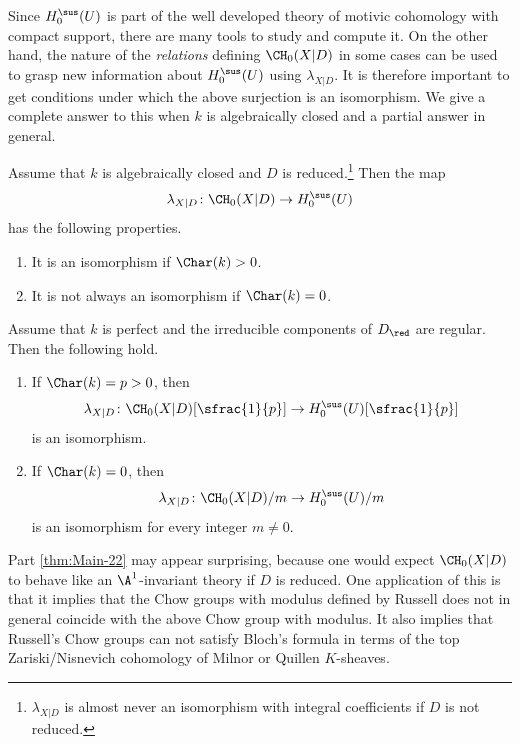 Since $H^{\sus}_0(U)$ is part of the well developed theory of
motivic cohomology with compact support, there are many tools
to study and compute it. On the other hand, the nature of the \emph{relations}
defining $\CH_0(X|D)$ in some cases
can be used to grasp new information about $H^{\sus}_0(U)$ using $\lambda_{X|D}$.
It is therefore important to get conditions under which the above surjection is an
isomorphism.
We give a complete answer to this when $k$ is algebraically closed and
a partial answer in general.

\begin{thm}\label{thm:Main-2}
Assume that $k$ is algebraically closed and $D$ is
reduced.\footnote{$\lambda_{X|D}$ is almost never an
isomorphism with integral coefficients if $D$ is not reduced.} Then the map
\[
\lambda_{X|D} \colon \CH_0(X|D) \to H^{\sus}_0(U)
\]
has the following properties.
\begin{enumerate}
\item\label{thm:Main-21}
It is an isomorphism if $\Char(k) > 0$.
\item\label{thm:Main-22}
It is not always an isomorphism if $\Char(k) = 0$.
\end{enumerate}
\end{thm}

\begin{thm}\label{thm:Main-2-fin}
Assume that $k$ is perfect and the irreducible components of $D_\red$ are regular.
Then the following hold.
\begin{enumerate}
\item\label{thm:Main-2-fin1}
If $\Char(k) = p > 0$, then
\[
\lambda_{X|D} \colon \CH_0(X|D)[\sfrac{1}{p}] \to H^{\sus}_0(U)[\sfrac{1}{p}]
\]
is an isomorphism.
\item\label{thm:Main-2-fin2}
If $\Char(k) = 0$, then
\[
\lambda_{X|D} \colon {\CH_0(X|D)}/m \to {H^{\sus}_0(U)}/m
\]
is an isomorphism for every integer $m \neq 0$.
\end{enumerate}
\end{thm}

Part \eqref{thm:Main-22}  may appear surprising, because one would expect
$\CH_0(X|D)$ to behave like an $\A^1$-invariant theory if $D$ is reduced.
One application of this is that it implies that
the Chow groups with modulus defined by Russell \cite{RussellANT} does
not in general coincide with the above Chow group with modulus.
It also implies that Russell's Chow groups can not satisfy Bloch's formula
in terms of the top Zariski/Nisnevich cohomology of Milnor or Quillen
$K$-sheaves.

